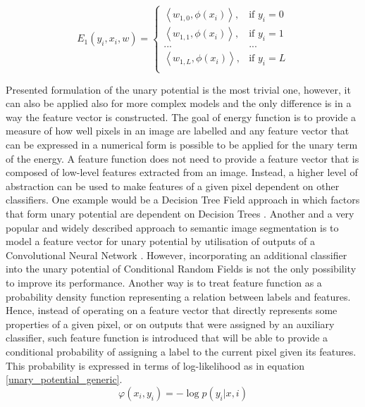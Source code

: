 \begin{equation}
    \label{eq:e1_weight_vector}
    E_1(y_i,x_i,w)= 
    \begin{cases}
        \left \langle w_{1,0}, \phi({x_i}) \right \rangle , &  \text{if } y_i = 0\\ 
        \left \langle w_{1,1}, \phi({x_i}) \right \rangle , & \text{if } y_i = 1\\
         ...& ...\\ 
        \left \langle w_{1,L}, \phi({x_i}) \right \rangle , & \text{if } y_i = L\\  
    \end{cases}
\end{equation}


Presented formulation of the unary potential is the most trivial one, however, it can also be applied also for more complex models and the only difference is in a way the feature vector is constructed. The goal of energy function is to provide a measure of how well pixels in an image are labelled and any feature vector that can be expressed in a numerical form is possible to be applied for the unary term of the energy. A feature function does not need to provide a feature vector that is composed of low-level features extracted from an image. Instead, a higher level of abstraction can be used to make features of a given pixel dependent on other classifiers. One example would be a Decision Tree Field approach in which factors that form unary potential are dependent on Decision Trees \cite{crf_decision_trees}. Another and a very popular and widely described approach to semantic image segmentation is to model a feature vector for unary potential by utilisation of outputs of a Convolutional Neural Network \cite{inference_crf, crf_cnn1, crf_cnn2}. However, incorporating an additional classifier into the unary potential of Conditional Random Fields is not the only possibility to improve its performance. Another way is to treat feature function as a probability density function representing a relation between labels and features. Hence, instead of operating on a feature vector that directly represents some properties of a given pixel, or on outputs that were assigned by an auxiliary classifier, such feature function is introduced that will be able to provide a conditional probability of assigning a label to the current pixel given its features. This probability is expressed in terms of log-likelihood as in equation \ref{unary_potential_generic}.
\begin{equation}
    \label{unary_potential_generic}
    \varphi(x_i,y_i) = -\log p(y_i|x,i)
\end{equation}
